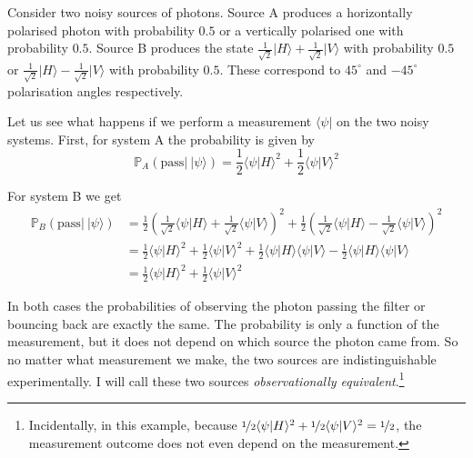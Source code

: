 \begin{example}
Consider two noisy sources of photons. Source A produces a horizontally polarised photon with probability $0.5$ or a vertically polarised one with probability $0.5$. Source B produces the state $\frac{1}{\sqrt{2}}\vert H \rangle + \frac{1}{\sqrt{2}} \vert V \rangle$ with probability $0.5$ or $\frac{1}{\sqrt{2}}\vert H \rangle - \frac{1}{\sqrt{2}} \vert V \rangle$ with probability $0.5$. These correspond to $45^{\circ}$ and $-45^{\circ}$ polarisation angles respectively.

Let us see what happens if we perform a measurement $\langle \psi \vert$ on the two noisy systems. First, for system A the probability is given by
\begin{equation}
\mathbb{P}_{A}\left( \mbox{pass} \vert\ \vert\psi\rangle \right) = \frac{1}{2} \langle\psi\vert H\rangle^2 + \frac{1}{2} \langle\psi\vert V\rangle^2
\end{equation}

For system B we get
\begin{align}
\mathbb{P}_{B}\left( \mbox{pass} \vert\ \vert\psi\rangle \right) &= \frac{1}{2} \left(\frac{1}{\sqrt{2}}\langle\psi\vert H\rangle + \frac{1}{\sqrt{2}}\langle\psi\vert V \rangle\right)^2 + \frac{1}{2} \left(\frac{1}{\sqrt{2}}\langle\psi\vert H\rangle - \frac{1}{\sqrt{2}}\langle\psi\vert V \rangle\right)^2 \\
	&= \frac{1}{2} \langle\psi\vert H\rangle^2 + \frac{1}{2} \langle\psi\vert V\rangle^2 + \frac{1}{2}\langle\psi\vert H\rangle\langle\psi\vert V\rangle - \frac{1}{2}\langle\psi\vert H\rangle\langle\psi\vert V\rangle \\
	&= \frac{1}{2} \langle\psi\vert H\rangle^2 + \frac{1}{2} \langle\psi\vert V\rangle^2
\end{align}

In both cases the probabilities of observing the photon passing the filter or bouncing back are exactly the same. The probability is only a function of the measurement, but it does not depend on which source the photon came from. So no matter what measurement we make, the two sources are indistinguishable experimentally. I will call these two sources \emph{observationally equivalent}.\footnote{Incidentally, in this example, because $\nicefrac{1}{2} \langle\psi\vert H\rangle^2 + \nicefrac{1}{2} \langle\psi\vert V\rangle^2 = \nicefrac{1}{2}$, the measurement outcome does not even depend on the measurement.}
\label{empl:two_noisy_systems}
\end{example}

